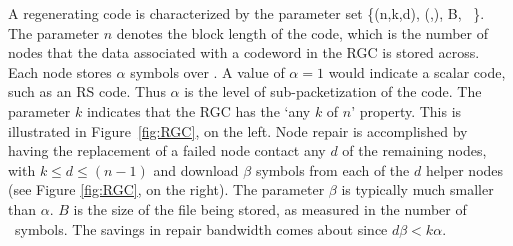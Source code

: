 \begin{multicols}{2}
	A regenerating code is characterized by the parameter set
	\bean
	\{(n,k,d), (\alpha,\beta), B, \fq\ \}.
	\eean
	The parameter $n$ denotes the block length of the code, which is the number of nodes that the data associated with a codeword in the RGC is stored across. Each node stores $\alpha$ symbols over \fq.  A value of $\alpha=1$ would indicate a scalar code, such as an RS code.  Thus $\alpha$ is the level of sub-packetization of the code. The parameter $k$ indicates that the RGC has the `any $k$ of $n$' property.  This is illustrated in Figure~\ref{fig:RGC}, on the left. Node repair is accomplished by having the replacement of a failed node contact any $d$ of the remaining nodes, with $k \leq d \leq (n-1)$ and download $\beta$ symbols from each of the $d$ helper nodes (see Figure \ref{fig:RGC}, on the right).  The parameter $\beta$ is typically much smaller than $\alpha$.  $B$ is the size of the file being stored, as measured in the number of \fq\ symbols.  The savings in repair bandwidth comes about since $d \beta < k \alpha $.
 \end{multicols}

